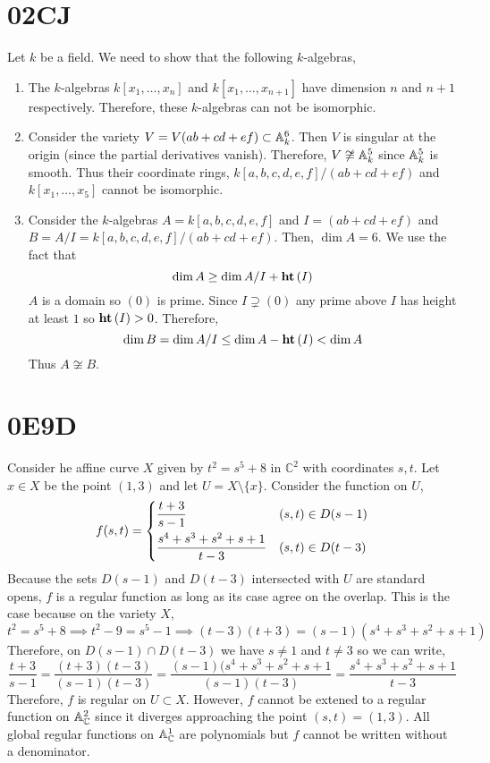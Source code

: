\documentclass[12pt]{article}
\begin{document}

\section{02CJ}

Let $k$ be a field.
We need to show that the following $k$-algebras,
\begin{enumerate}
\item 
The $k$-algebras $k[x_1, \dots, x_n]$ and $k[x_1, \dots, x_{n+1}]$ have dimension $n$ and $n + 1$ respectively. Therefore, these $k$-algebras can not be isomorphic.
\item  
Consider the variety $V = V(ab + cd + ef) \subset \mathbb{A}^6_k$. Then $V$ is singular at the origin (since the partial derivatives vanish). Therefore, $V \not\cong \mathbb{A}^5_k$ since $\mathbb{A}^5_k$ is smooth. Thus their coordinate rings, $k[a,b,c,d,e,f] / (ab + cd + ef)$ and $k[x_1, \dots, x_5]$ cannot be isomorphic. 

\item 
Consider the $k$-algebras $A = k[a, b, c, d, e, f]$ and $I = (ab + cd + ef)$ and $B = A / I = k[a,b,c,d,e,f] / (ab+ cd + ef)$. Then, $\dim{A} = 6$. We use the fact that
\[ \dim{A} \ge \dim{A / I}  + \mathbf{ht}\left( I \right) \] 
$A$ is a domain so $(0)$ is prime. Since $I \supsetneq (0)$ any prime above $I$ has height at least $1$ so $\mathbf{ht}\left( I \right) > 0$. Therefore,
\[ \dim{B} = \dim{A / I} \le \dim{A} - \mathbf{ht}\left( I \right) < \dim{A} \] 
Thus $A \not\cong B$. 
\end{enumerate} 

\renewcommand{\C}{\mathbb{C}}

\section{0E9D}

Consider he affine curve $X$ given by $t^2 = s^5 + 8$ in $\C^2$ with coordinates $s,t$. Let $x \in X$ be the point $(1, 3)$ and let $U = X \setminus \{x\}$. Consider the function on $U$,
\[
f(s, t) =
\begin{dcases}
\frac{t + 3}{s - 1} & (s,t) \in D(s - 1)
\\
\frac{s^4 + s^3 + s^2 + s + 1}{t - 3} & (s,t) \in D(t - 3) 
\end{dcases}
\]
Because the sets $D(s - 1)$ and $D(t - 3)$ intersected with $U$ are standard opens, $f$ is a regular function as long as its case agree on the overlap. This is the case because on the variety $X$,
\[ t^2 = s^5 + 8 \implies t^2 - 9 = s^5 - 1 \implies (t - 3)(t + 3) = (s - 1)(s^4 + s^3 + s^2 + s + 1) \]
Therefore, on $D(s - 1) \cap D(t - 3)$ we have $s \neq 1$ and $t \neq 3$ so we can write,
\[ \frac{t + 3}{s - 1} = \frac{(t + 3)(t - 3)}{(s - 1)(t - 3)} = \frac{(s - 1)(s^4 + s^3 + s^2 + s + 1}{(s - 1)(t - 3)} = \frac{s^4 + s^3 + s^2 + s + 1}{t - 3} \]
Therefore, $f$ is regular on $U \subset X$. However, $f$ cannot be extened to a regular function on $\A^2_\C$ since it diverges approaching the point $(s, t) = (1,3)$. All global regular functions on $\A^1_\C$ are polynomials but $f$ cannot be written without a denominator. 
\end{document}
